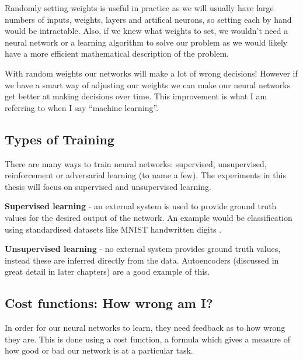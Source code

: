 Randomly setting weights is useful in practice as we will usually have large numbers of inputs, weights, layers and artifical neurons, so setting each by hand would be intractable. Also, if we knew what weights to set, we wouldn't need a neural network or a learning algorithm to solve our problem as we would likely have a more efficient mathematical description of the problem.

With random weights our networks will make a lot of wrong decisions! However if we have a smart way of adjusting our weights we can make our neural networks get better at making decisions over time. This improvement is what I am referring to when I say ``machine learning''.

\subsection{Types of Training}
There are many ways to train neural networks: supervised, unsupervised, reinforcement or 
adversarial learning (to name a few). The experiments in this thesis will focus on supervised and unsupervised learning. %


\textbf{Supervised learning} - an external system is used to provide ground truth values for the desired output of the network. An example would be classification using standardised datasets like MNIST handwritten digits \cite{lecun1998mnist}.


\textbf{Unsupervised learning} - no external system provides ground truth values, instead these are inferred directly from the data. Autoencoders (discussed in great detail in later chapters) are a good example of this.  




\subsection{Cost functions: How wrong am I?}
In order for our neural networks to learn, they need feedback as to how wrong they are. This is done using a cost function, a formula which gives a measure of how good or bad our network is at a particular task.


